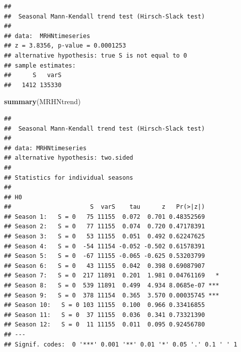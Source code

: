 \documentclass[12pt,]{article}
\newenvironment{Shaded}{\begin{snugshade}}{\end{snugshade}}
\newcommand{\CommentTok}[1]{\textcolor[rgb]{0.56,0.35,0.01}{\textit{#1}}}
\newcommand{\DataTypeTok}[1]{\textcolor[rgb]{0.13,0.29,0.53}{#1}}
\newcommand{\DecValTok}[1]{\textcolor[rgb]{0.00,0.00,0.81}{#1}}
\newcommand{\KeywordTok}[1]{\textcolor[rgb]{0.13,0.29,0.53}{\textbf{#1}}}
\newcommand{\NormalTok}[1]{#1}
\newcommand{\OperatorTok}[1]{\textcolor[rgb]{0.81,0.36,0.00}{\textbf{#1}}}
\newcommand{\StringTok}[1]{\textcolor[rgb]{0.31,0.60,0.02}{#1}}
\begin{document}
\begin{Shaded}
\end{Shaded}

\begin{verbatim}
## 
##  Seasonal Mann-Kendall trend test (Hirsch-Slack test)
## 
## data:  MRHNtimeseries
## z = 3.8356, p-value = 0.0001253
## alternative hypothesis: true S is not equal to 0
## sample estimates:
##      S   varS 
##   1412 135330
\end{verbatim}

\begin{Shaded}
\begin{Highlighting}[]
\KeywordTok{summary}\NormalTok{(MRHNtrend)}
\end{Highlighting}
\end{Shaded}

\begin{verbatim}
## 
##  Seasonal Mann-Kendall trend test (Hirsch-Slack test)
## 
## data: MRHNtimeseries
## alternative hypothesis: two.sided
## 
## Statistics for individual seasons
## 
## H0
##                      S  varS    tau      z   Pr(>|z|)    
## Season 1:   S = 0   75 11155  0.072  0.701 0.48352569    
## Season 2:   S = 0   77 11155  0.074  0.720 0.47178391    
## Season 3:   S = 0   53 11155  0.051  0.492 0.62247625    
## Season 4:   S = 0  -54 11154 -0.052 -0.502 0.61578391    
## Season 5:   S = 0  -67 11155 -0.065 -0.625 0.53203799    
## Season 6:   S = 0   43 11155  0.042  0.398 0.69087907    
## Season 7:   S = 0  217 11891  0.201  1.981 0.04761169   *
## Season 8:   S = 0  539 11891  0.499  4.934 8.0685e-07 ***
## Season 9:   S = 0  378 11154  0.365  3.570 0.00035745 ***
## Season 10:   S = 0 103 11155  0.100  0.966 0.33416855    
## Season 11:   S = 0  37 11155  0.036  0.341 0.73321390    
## Season 12:   S = 0  11 11155  0.011  0.095 0.92456780    
## ---
## Signif. codes:  0 '***' 0.001 '**' 0.01 '*' 0.05 '.' 0.1 ' ' 1
\end{verbatim}
\end{document}

